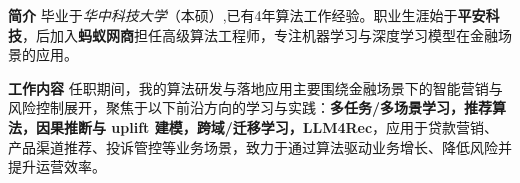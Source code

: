 %
%

\par{
{\textbf{简介}} 
毕业于\emph{华中科技大学}（本硕）,已有4年算法工作经验。职业生涯始于\textbf{平安科技}，后加入\textbf{蚂蚁网商}担任高级算法工程师，专注机器学习与深度学习模型在金融场景的应用。


{\textbf{工作内容}} 
任职期间，我的算法研发与落地应用主要围绕金融场景下的智能营销与风险控制展开，聚焦于以下前沿方向的学习与实践：\textbf{多任务/多场景学习，推荐算法，因果推断与 uplift 建模，跨域/迁移学习，LLM4Rec}，应用于贷款营销、产品渠道推荐、投诉管控等业务场景，致力于通过算法驱动业务增长、降低风险并提升运营效率。
}